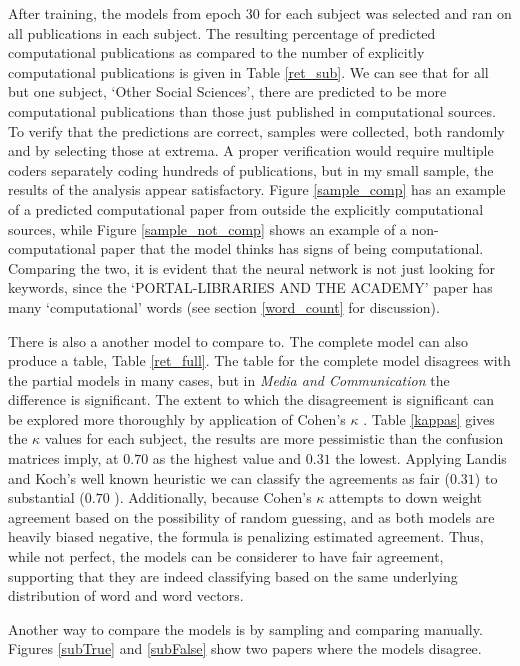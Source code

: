 \documentclass[12pt, a4paper]{article}
\begin{document}
After training, the models from epoch 30 for each subject was selected and ran on all publications in each subject. The resulting percentage of predicted computational publications as compared to the number of explicitly computational publications is given in Table \ref{ret_sub}. We can see that for all but one subject, `Other Social Sciences', there are predicted to be more computational publications than those just published in computational sources. To verify that the predictions are correct, samples were collected, both randomly and by selecting those at extrema. A proper verification would require multiple coders separately coding hundreds of publications, but in my small sample, the results of the analysis appear satisfactory. Figure \ref{sample_comp} has an example of a predicted computational paper from outside the explicitly computational sources, while Figure \ref{sample_not_comp} shows an example of a non-computational paper that the model thinks has signs of being computational. Comparing the two, it is evident that the neural network is not just looking for keywords, since the `PORTAL-LIBRARIES AND THE ACADEMY' paper has many `computational' words (see section \ref{word_count} for discussion).

There is also a another model to compare to. The complete model can also produce a table, Table \ref{ret_full}. The table for the complete model disagrees with the partial models in many cases, but in \textit{Media and Communication} the difference is significant. The extent to which the disagreement is significant can be explored more thoroughly by application of Cohen's $\kappa$ \citep{cohen1960coefficient}. Table \ref{kappas} gives the $\kappa$ values for each subject, the results are more pessimistic than the confusion matrices imply, at $0.70$ as the highest value and $0.31$ the lowest. Applying Landis and Koch's well known heuristic \citep{landis1977measurement} we can classify the agreements as fair ($0.31$) to substantial ($0.70$ ). Additionally, because Cohen's $\kappa$ attempts to down weight agreement based on the possibility of random guessing, and as both models are heavily biased negative, the formula is penalizing estimated agreement. Thus, while not perfect, the models can be considerer to have fair agreement, supporting that they are indeed classifying based on the same underlying distribution of word and word vectors.

Another way to compare the models is by sampling and comparing manually. Figures \ref{subTrue} and \ref{subFalse} show two papers where the models disagree.
\end{document}
